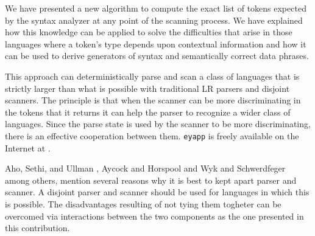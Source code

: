 We have presented a new algorithm to compute the exact list of tokens 
expected by the syntax analyzer at any point of the scanning process.
We have explained how this knowledge can be applied 
to solve the difficulties that arise  in
those languages where a token's type depends upon
contextual information and how
it can be used to derive generators 
of syntax and semantically correct data phrases.

This approach can deterministically parse and scan a class
of languages that is strictly larger than what is possible with
traditional LR parsers and disjoint scanners. The principle is
that when the scanner can be more discriminating in the tokens that
it returns it can help the parser to recognize a wider class of
languages. Since the parse state is used by the scanner to be more
discriminating, there is an effective cooperation between them.
\verb|eyapp| is freely available on the Internet at  \cite{Rodriguez:Leon}.

Aho, Sethi, and Ullman \cite[p.84-85]{aho1986}, 
Aycock and Horspool
\cite{schrodingerstoken} and 
Wyk and Schwerdfeger \cite{wyk}
among others,
mention several reasons why it is best to kept apart parser
and scanner.
A disjoint parser and scanner should be used for languages in which
this is possible. The disadvantages resulting of not tying them 
togheter can be overcomed via interactions between the two components as 
the one presented in this contribution.
